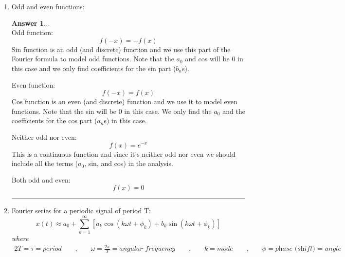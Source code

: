 \documentclass{amsart}
\theoremstyle{definition}
\newtheorem*{Ans}{Answer}
\begin{document}
\begin{enumerate}
    \item Odd and even functions:
		\begin{Ans} 
        	. \\
            
            Odd function:
            \begin{equation}
            f(-x) = -f(x)
            \end{equation}
            Sin function is an odd (and discrete) function and we use this part of the Fourier formula to model odd functions. Note that the $a_0$ and cos will be 0 in this case and we only find coefficients for the sin part ($b_n$s).\\
                        \bigskip
                        
        	Even function: 
            \begin{equation}
            f(-x) = f(x)
            \end{equation}
            Cos function is an even (and discrete) function and we use it to model even functions. Note that the sin will be 0 in this case. We only find the $a_0$ and the coefficients for the cos part ($a_n$s) in this case.\\
                         \bigskip

            Neither odd nor even:
            \begin{equation}
            f(x) = e^{-x}
                        \end{equation}
            This is a continuous function and since it's neither odd nor even we should include all the terms ($a_0$, sin, and cos) in the analysis.

            
            Both odd and even:
            \begin{equation}
            f(x) = 0
            \end{equation}
            
        \end{Ans}
\vspace{.5cm}
\hrule
\vspace{.5cm}

\item Fourier series for a periodic signal of period T:
        	\[ x(t) \approx a_0 + \sum_{k=1}^{\infty} [a_k \cos (k \omega t + \phi_k) + b_k \sin (k \omega t + \phi_k)] \]
        \textit{where}
        \begin{alignat*}{2}
             T = \tau =\textit{period} \qquad\text{,}\qquad \omega = \frac {2 \pi}{T} = \textit{angular frequency} \qquad\text{,}\qquad k = \textit{mode} \qquad\text{,}\qquad \phi = \textit{phase (shift) = angle}
        \end{alignat*}  
        

\end{enumerate}
\end{document}
